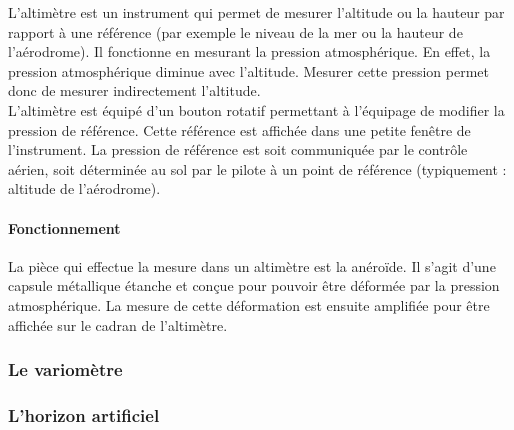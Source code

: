 	L'\gls{altimètre} est un instrument qui permet de mesurer l'altitude ou la hauteur par rapport à une référence (par exemple le niveau de la mer ou la hauteur de l'aérodrome). Il fonctionne en mesurant la pression atmosphérique. En effet, la pression atmosphérique diminue avec l'altitude. Mesurer cette pression permet donc de mesurer indirectement l'altitude. \\
	
	L'altimètre est équipé d'un bouton rotatif permettant à l'équipage de modifier la pression de référence. Cette référence est affichée dans une petite fenêtre de l'instrument. La pression de référence est soit communiquée par le contrôle aérien, soit déterminée au sol par le pilote à un point de référence (typiquement : altitude de l'aérodrome).
	
	
	\begin{figure}[H]	
	\centering
	\end{figure}
	
	\paragraph{Fonctionnement} La pièce qui effectue la mesure dans un altimètre est la \gls{anéroïde}. Il s'agit d'une capsule métallique étanche et conçue pour pouvoir être déformée par la pression atmosphérique. La mesure de cette déformation est ensuite amplifiée pour être affichée sur le cadran de l'altimètre.
	
	\subsubsection{Le variomètre}
	
	\begin{figure}[H]	
	\centering
	\end{figure}
	
	\subsubsection{L'horizon artificiel}
	
